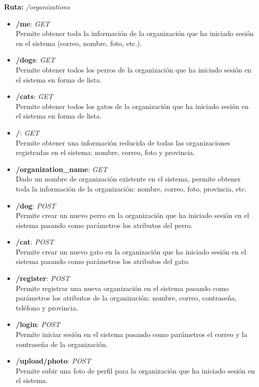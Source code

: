 \textbf{Ruta:} \textit{/organizations}

\begin{itemize}
    \item \textbf{/me}: \textit{GET} \\
    Permite obtener toda la información de la organización que ha iniciado sesión en el sistema (correo, nombre, foto, etc.).
    \item \textbf{/dogs}: \textit{GET} \\
    Permite obtener todos los perros de la organización que ha iniciado sesión en el sistema en forma de lista.
    \item \textbf{/cats}: \textit{GET} \\
    Permite obtener todos los gatos de la organización que ha iniciado sesión en el sistema en forma de lista.
    \item \textbf{/}: \textit{GET} \\
    Permite obtener una información reducida de todas las organizaciones registradas en el sistema: nombre, correo, foto y provincia.
    \item \textbf{/{organization\_name}}: \textit{GET} \\
    Dado un nombre de organización existente en el sistema, permite obtener toda la información de la organización: nombre, correo, foto, provincia, etc.
    \item \textbf{/dog}: \textit{POST} \\
    Permite crear un nuevo perro en la organización que ha iniciado sesión en el sistema pasando como parámetros los atributos del perro.
    \item \textbf{/cat}: \textit{POST} \\
    Permite crear un nuevo gato en la organización que ha iniciado sesión en el sistema pasando como parámetros los atributos del gato.
    \item \textbf{/register}: \textit{POST} \\
    Permite registrar una nueva organización en el sistema pasando como parámetros los atributos de la organización: nombre, correo, contraseña, teléfono y provincia.
    \item \textbf{/login}: \textit{POST} \\
    Permite iniciar sesión en el sistema pasando como parámetros el correo y la contraseña de la organización.
    \item \textbf{/upload/photo}: \textit{POST} \\
    Permite subir una foto de perfil para la organización que ha iniciado sesión en el sistema.

\end{itemize}
